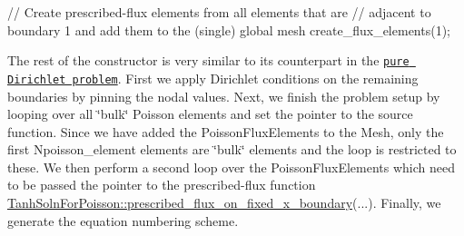 \begin{DoxyCodeInclude}
 \textcolor{comment}{// Create prescribed-flux elements from all elements that are }
 \textcolor{comment}{// adjacent to boundary 1 and add them to the (single) global mesh}
 create\_flux\_elements(1);

\end{DoxyCodeInclude}


The rest of the constructor is very similar to its counterpart in the \href{../../../poisson/two_d_poisson/html/index.html}{\tt pure Dirichlet problem}. First we apply Dirichlet conditions on the remaining boundaries by pinning the nodal values. Next, we finish the problem setup by looping over all \char`\"{}bulk\char`\"{} Poisson elements and set the pointer to the source function. Since we have added the {\ttfamily Poisson\+Flux\+Elements} to the {\ttfamily Mesh}, only the first {\ttfamily Npoisson\+\_\+element} elements are \char`\"{}bulk\char`\"{} elements and the loop is restricted to these. We then perform a second loop over the {\ttfamily Poisson\+Flux\+Elements} which need to be passed the pointer to the prescribed-\/flux function {\ttfamily \hyperlink{namespaceTanhSolnForPoisson_a0e99ccf27df36f28f091de6d57484172}{Tanh\+Soln\+For\+Poisson\+::prescribed\+\_\+flux\+\_\+on\+\_\+fixed\+\_\+x\+\_\+boundary}}(...). Finally, we generate the equation numbering scheme.


